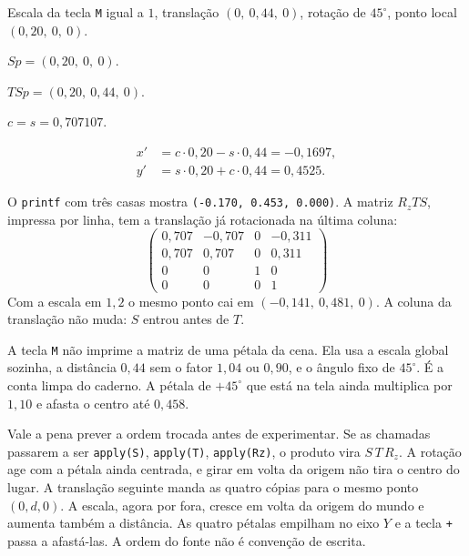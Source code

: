 \documentclass[11pt,a4paper]{article}
\newcommand{\fn}[1]{\texttt{\nobreak\hspace{0pt}#1}}
\begin{document}
\begin{conta}
Escala da tecla \fn{M} igual a \(1\), translação \((0,\ 0{,}44,\ 0)\), rotação de \(45^\circ\), ponto local \((0{,}20,\ 0,\ 0)\).

\(S p = (0{,}20,\ 0,\ 0)\).

\(T S p = (0{,}20,\ 0{,}44,\ 0)\).

\(c = s = 0{,}707107\).

\begin{align*}
x' &= c\cdot 0{,}20 - s\cdot 0{,}44 = -0{,}1697,\\
y' &= s\cdot 0{,}20 + c\cdot 0{,}44 = 0{,}4525.
\end{align*}

O \fn{printf} com três casas mostra \fn{(-0.170, 0.453, 0.000)}. A matriz \(R_z T S\), impressa por linha, tem a translação já rotacionada na última coluna:
\[
\begin{pmatrix}
0{,}707 & -0{,}707 & 0 & -0{,}311 \\
0{,}707 &  0{,}707 & 0 &  0{,}311 \\
0 & 0 & 1 & 0 \\
0 & 0 & 0 & 1
\end{pmatrix}
\]
Com a escala em \(1{,}2\) o mesmo ponto cai em \((-0{,}141,\ 0{,}481,\ 0)\). A coluna da translação não muda: \(S\) entrou antes de \(T\).
\end{conta}

\begin{cuidado}
A tecla \fn{M} não imprime a matriz de uma pétala da cena. Ela usa a escala global sozinha, a distância \(0{,}44\) sem o fator \(1{,}04\) ou \(0{,}90\), e o ângulo fixo de \(45^\circ\). É a conta limpa do caderno. A pétala de \(+45^\circ\) que está na tela ainda multiplica por \(1{,}10\) e afasta o centro até \(0{,}458\).
\end{cuidado}

Vale a pena prever a ordem trocada antes de experimentar. Se as chamadas passarem a ser \fn{apply(S)}, \fn{apply(T)}, \fn{apply(Rz)}, o produto vira \(S\, T\, R_z\). A rotação age com a pétala ainda centrada, e girar em volta da origem não tira o centro do lugar. A translação seguinte manda as quatro cópias para o mesmo ponto \((0, d, 0)\). A escala, agora por fora, cresce em volta da origem do mundo e aumenta também a distância. As quatro pétalas empilham no eixo \(Y\) e a tecla \fn{+} passa a afastá-las. A ordem do fonte não é convenção de escrita.
\end{document}
